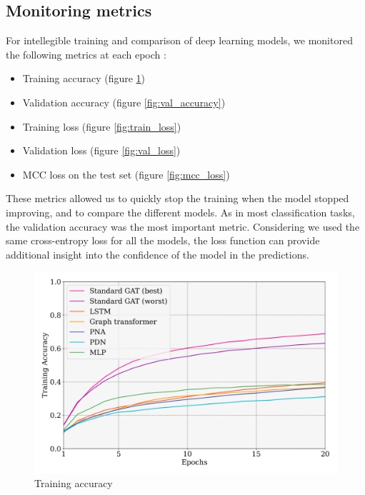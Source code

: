 \documentclass[switch, 11pt]{article}
\begin{document}
\begin{multicols}{2}
    \subsection{Monitoring metrics}

    For intellegible training and comparison of deep learning models, we monitored the following metrics at each epoch :
    \begin{itemize}
        \item Training accuracy (figure \ref{fig:train_accuracy})
        \item Validation accuracy (figure \ref{fig:val_accuracy})
        \item Training loss (figure \ref{fig:train_loss})
        \item Validation loss (figure \ref{fig:val_loss})
        \item MCC loss on the test set (figure \ref{fig:mcc_loss})
    \end{itemize}

    These metrics allowed us to quickly stop the training when the model stopped improving, and to compare the different models. As in most classification tasks, the validation accuracy was the most important metric. Considering we used the same cross-entropy loss for all the models, the loss function can provide additional insight into the confidence of the model in the predictions.

    \begin{figure}[H]
        \centering
        \includegraphics[width=\columnwidth]{figures/train_accuracy.png}
        \caption{Training accuracy}
        \label{fig:train_accuracy}
    \end{figure}


\end{multicols}
\end{document}
